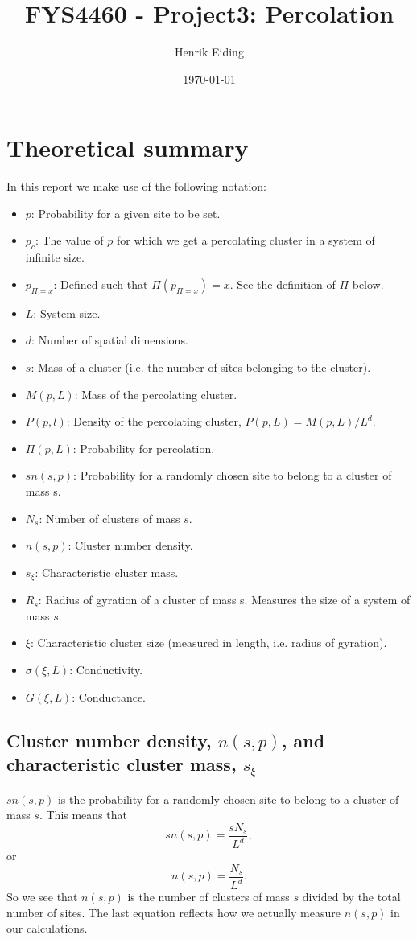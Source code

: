 \documentclass[12pt]{article}
\newcommand{\bdi}{\begin{displaymath}}
\newcommand{\edi}{\end{displaymath}}
\begin{document}
\title{FYS4460 - Project3: Percolation}
\author{Henrik Eiding}
\date{\today}
\maketitle
\thispagestyle{empty}
\newpage


\section*{Theoretical summary}

In this report we make use of the following notation:
\begin{itemize}
 \item $p$: Probability for a given site to be set.
 \item $p_c$: The value of $p$ for which we get a percolating cluster in a system of infinite size.
 \item $p_{\Pi=x}$: Defined such that $\Pi(p_{\Pi=x})=x$. See the definition of $\Pi$ below.
 \item $L$: System size.
 \item $d$: Number of spatial dimensions.
 \item $s$: Mass of a cluster (i.e. the number of sites belonging to the cluster).
 \item $M(p,L)$: Mass of the percolating cluster.
 \item $P(p,l)$: Density of the percolating cluster, $P(p,L) = M(p,L)/L^d$.
 \item $\Pi(p,L)$: Probability for percolation.
 \item $sn(s,p)$: Probability for a randomly chosen site to belong to a cluster of mass s.
 \item $N_s$: Number of clusters of mass $s$.
 \item $n(s,p)$: Cluster number density.
 \item $s_\xi$: Characteristic cluster mass.
 \item $R_s$: Radius of gyration of a cluster of mass s. Measures the size of a system of mass $s$.
 \item $\xi$: Characteristic cluster size (measured in length, i.e. radius of gyration).
 \item $\sigma(\xi,L)$: Conductivity.
 \item $G(\xi,L)$: Conductance.
\end{itemize}


\subsection*{Cluster number density, $n(s,p)$, and characteristic cluster mass, $s_\xi$}
$sn(s,p)$ is the probability for a randomly chosen site to belong to a cluster of mass $s$. This means that
\bdi
sn(s,p) = \frac{sN_s}{L^d},
\edi
or
\bdi
n(s,p) = \frac{N_s}{L^d}.
\edi
So we see that $n(s,p)$ is the number of clusters of mass $s$ divided by the total number of sites. The last equation reflects how we actually measure $n(s,p)$ in our calculations.
\end{document}
